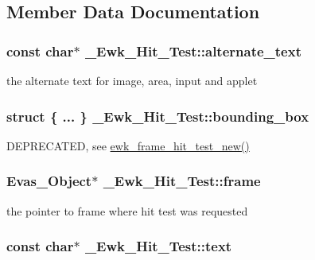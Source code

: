 \subsection{Member Data Documentation}
\hypertarget{struct__Ewk__Hit__Test_aa60e87b32b6ff59ae9d9559195ecada1}{
\subsubsection[{alternate\+\_\+text}]{\setlength{\rightskip}{0pt plus 5cm}const char$\ast$ \+\_\+\+Ewk\+\_\+\+Hit\+\_\+\+Test\+::alternate\+\_\+text}}\label{struct__Ewk__Hit__Test_aa60e87b32b6ff59ae9d9559195ecada1}
the alternate text for image, area, input and applet \hypertarget{struct__Ewk__Hit__Test_a800263ae02eea53f8f9d222766eac8d0}{
\subsubsection[{bounding\+\_\+box}]{\setlength{\rightskip}{0pt plus 5cm}struct \{ ... \}   \+\_\+\+Ewk\+\_\+\+Hit\+\_\+\+Test\+::bounding\+\_\+box}}\label{struct__Ewk__Hit__Test_a800263ae02eea53f8f9d222766eac8d0}
D\+E\+P\+R\+E\+C\+A\+T\+E\+D, see \hyperlink{ewk__frame_8h_a91dcc8ff8536253cb2517648234af339}{ewk\+\_\+frame\+\_\+hit\+\_\+test\+\_\+new()} \hypertarget{struct__Ewk__Hit__Test_afa2eff1382529f44e2e2d16517b3010c}{
\subsubsection[{frame}]{\setlength{\rightskip}{0pt plus 5cm}Evas\+\_\+\+Object$\ast$ \+\_\+\+Ewk\+\_\+\+Hit\+\_\+\+Test\+::frame}}\label{struct__Ewk__Hit__Test_afa2eff1382529f44e2e2d16517b3010c}
the pointer to frame where hit test was requested \hypertarget{struct__Ewk__Hit__Test_ae815b4549004d160d9918812a338c944}{
\subsubsection[{text}]{\setlength{\rightskip}{0pt plus 5cm}const char$\ast$ \+\_\+\+Ewk\+\_\+\+Hit\+\_\+\+Test\+::text}}\label{struct__Ewk__Hit__Test_ae815b4549004d160d9918812a338c944}
